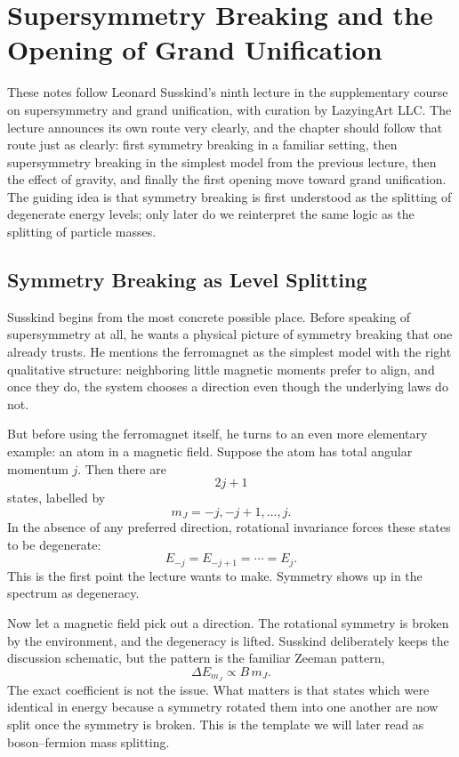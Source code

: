 \chapter{Supersymmetry Breaking and the Opening of Grand Unification}

These notes follow Leonard Susskind's ninth lecture in the supplementary course on supersymmetry and grand unification, with curation by LazyingArt LLC. The lecture announces its own route very clearly, and the chapter should follow that route just as clearly: first symmetry breaking in a familiar setting, then supersymmetry breaking in the simplest model from the previous lecture, then the effect of gravity, and finally the first opening move toward grand unification. The guiding idea is that symmetry breaking is first understood as the splitting of degenerate energy levels; only later do we reinterpret the same logic as the splitting of particle masses.

\section{Symmetry Breaking as Level Splitting}

Susskind begins from the most concrete possible place. Before speaking of supersymmetry at all, he wants a physical picture of symmetry breaking that one already trusts. He mentions the ferromagnet as the simplest model with the right qualitative structure: neighboring little magnetic moments prefer to align, and once they do, the system chooses a direction even though the underlying laws do not.

But before using the ferromagnet itself, he turns to an even more elementary example: an atom in a magnetic field. Suppose the atom has total angular momentum \(j\). Then there are
\begin{equation}
2j+1
\end{equation}
states, labelled by
\begin{equation}
m_J=-j,-j+1,\dots,j.
\end{equation}
In the absence of any preferred direction, rotational invariance forces these states to be degenerate:
\begin{equation}
E_{-j}=E_{-j+1}=\cdots=E_j.
\end{equation}
This is the first point the lecture wants to make. Symmetry shows up in the spectrum as degeneracy.

Now let a magnetic field pick out a direction. The rotational symmetry is broken by the environment, and the degeneracy is lifted. Susskind deliberately keeps the discussion schematic, but the pattern is the familiar Zeeman pattern,
\begin{equation}
\Delta E_{m_J}\propto B\,m_J.
\end{equation}
The exact coefficient is not the issue. What matters is that states which were identical in energy because a symmetry rotated them into one another are now split once the symmetry is broken. This is the template we will later read as boson--fermion mass splitting.

